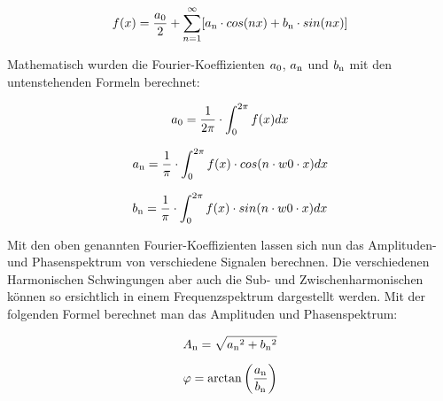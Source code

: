 \begin{equation}
f(x) = {\frac{a\textsubscript{0}}{2}}+\sum_{n=1}^\infty[a\textsubscript{n} \cdot cos(nx)+b\textsubscript{n} \cdot sin(nx)]
\end{equation}


Mathematisch wurden die Fourier-Koeffizienten $a\textsubscript{0}$, $a\textsubscript{n}$ und $b\textsubscript{n}$ mit den untenstehenden Formeln berechnet: 

\begin{equation}
a\textsubscript{0} =  {\frac{1}{2\pi} \cdot \int_{0}^{2\pi} f(x) dx}
\end{equation}

\begin{equation}
a\textsubscript{n} =  {\frac{1}{\pi} \cdot \int_{0}^{2\pi} f(x) \cdot cos(n \cdot w0 \cdot x) dx}
\end{equation}

\begin{equation}
b\textsubscript{n} =  {\frac{1}{\pi} \cdot \int_{0}^{2\pi} f(x) \cdot sin(n \cdot w0 \cdot x) dx}
\end{equation}

Mit den oben genannten Fourier-Koeffizienten lassen sich nun das Amplituden- und Phasenspektrum von verschiedene Signalen berechnen. Die verschiedenen Harmonischen Schwingungen aber auch die Sub- und Zwischenharmonischen können so ersichtlich in einem Frequenzspektrum dargestellt werden. Mit der folgenden Formel berechnet man das Amplituden und Phasenspektrum:

\begin{equation}
A\textsubscript{n} = {\sqrt{a\textsubscript{n}^2+b\textsubscript{n}^2}}
\end{equation}

\begin{equation}
\varphi = \arctan\left( \frac{a\textsubscript{n}}{b\textsubscript{n}}\right) 
\end{equation}



